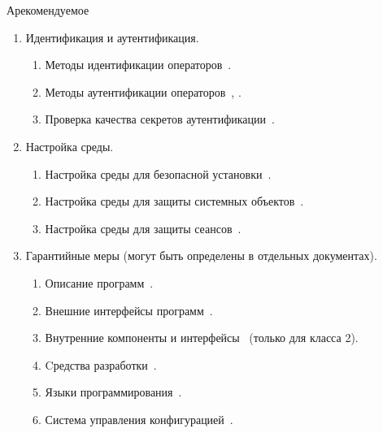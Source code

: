 \begin{appendix}{А}{рекомендуемое}
\begin{enumerate}
\begin{enumerate}
\item
Оценка энтропии источников случайности~.

\item
Тестирование выходных последовательностей генераторов~.
\end{enumerate}

\item
{Идентификация и аутентификация.}

\begin{enumerate}
\item
Методы идентификации операторов~.

\item
Методы аутентификации операторов~, .

\item
Проверка качества секретов аутентификации~.
\end{enumerate}

\item
{Настройка среды.}

\begin{enumerate}
\item
Настройка среды для безопасной установки~.

\item
Настройка среды для защиты системных объектов~.

\item
Настройка среды для защиты сеансов~.
\end{enumerate}

\item
Гарантийные меры (могут быть определены в отдельных документах).
\begin{enumerate}
\item
Описание программ~.

\item
Внешние интерфейсы программ~.

\item
Внутренние компоненты и интерфейсы~
(только для класса 2).

\item
Cредства разработки~.

\item
Языки программирования~.

\item
Система управления конфигурацией~.


\end{enumerate}
\end{enumerate}
\end{appendix}

